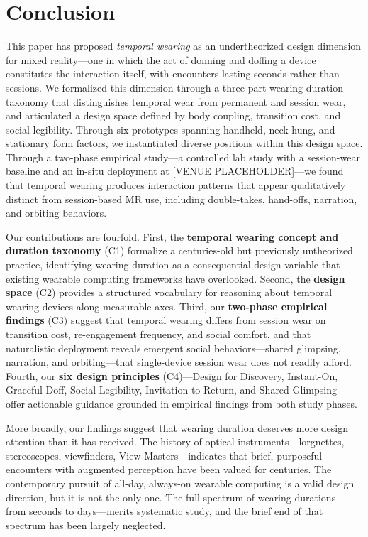 
\section{Conclusion}

This paper has proposed \textit{temporal wearing} as an undertheorized design dimension for mixed reality---one in which the act of donning and doffing a device constitutes the interaction itself, with encounters lasting seconds rather than sessions. We formalized this dimension through a three-part wearing duration taxonomy that distinguishes temporal wear from permanent and session wear, and articulated a design space defined by body coupling, transition cost, and social legibility. Through six prototypes spanning handheld, neck-hung, and stationary form factors, we instantiated diverse positions within this design space. Through a two-phase empirical study---a controlled lab study with a session-wear baseline and an in-situ deployment at [VENUE PLACEHOLDER]---we found that temporal wearing produces interaction patterns that appear qualitatively distinct from session-based MR use, including double-takes, hand-offs, narration, and orbiting behaviors.

Our contributions are fourfold. First, the \textbf{temporal wearing concept and duration taxonomy} (C1) formalize a centuries-old but previously untheorized practice, identifying wearing duration as a consequential design variable that existing wearable computing frameworks have overlooked. Second, the \textbf{design space} (C2) provides a structured vocabulary for reasoning about temporal wearing devices along measurable axes. Third, our \textbf{two-phase empirical findings} (C3) suggest that temporal wearing differs from session wear on transition cost, re-engagement frequency, and social comfort, and that naturalistic deployment reveals emergent social behaviors---shared glimpsing, narration, and orbiting---that single-device session wear does not readily afford. Fourth, our \textbf{six design principles} (C4)---Design for Discovery, Instant-On, Graceful Doff, Social Legibility, Invitation to Return, and Shared Glimpsing---offer actionable guidance grounded in empirical findings from both study phases.

More broadly, our findings suggest that wearing duration deserves more design attention than it has received. The history of optical instruments---lorgnettes, stereoscopes, viewfinders, View-Masters---indicates that brief, purposeful encounters with augmented perception have been valued for centuries. The contemporary pursuit of all-day, always-on wearable computing is a valid design direction, but it is not the only one. The full spectrum of wearing durations---from seconds to days---merits systematic study, and the brief end of that spectrum has been largely neglected.

